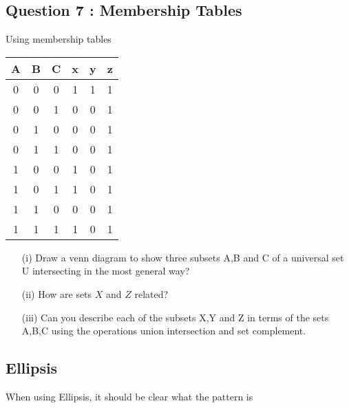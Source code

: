 \documentclass[]{report}
\begin{document}
\subsection*{Question 7 : Membership Tables}
Using membership tables
\begin{tabular}{|ccc|c|c|c|}
	\hline
	A & B & C & x & y & z \\\hline
	0 & 0 & 0 & 1 & 1 & 1 \\
	0 & 0 & 1 & 0 & 0 & 1 \\
	0 & 1 & 0 & 0 & 0 & 1 \\
	0 & 1 & 1 & 0 & 0 & 1 \\
	1 & 0 & 0 & 1 & 0 & 1 \\
	1 & 0 & 1 & 1 & 0 & 1 \\
	1 & 1 & 0 & 0 & 0 & 1 \\
	1 & 1 & 1 & 1 & 0 & 1 \\
	\hline
\end{tabular}
\begin{itemize}
	\item[(i)] Draw a venn diagram to show three subsets A,B and C of a universal set U intersecting in
	the most general way?
	\item[(ii)] How are sets $X$ and $Z$ related?
	\item[(iii)] Can you describe each of the subsets X,Y and Z in terms  of the
	sets A,B,C using the operations union intersection and set complement.
\end{itemize}


\subsection{Ellipsis}

When using Ellipsis, it should be clear what the pattern is













\end{document}
